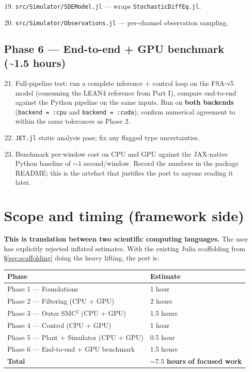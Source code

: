 \documentclass[11pt,a4paper]{article}
\begin{document}
\begin{enumerate}\setcounter{enumi}{18}
\item \texttt{src/Simulator/SDEModel.jl} --- wraps
  \texttt{StochasticDiffEq.jl}.
\item \texttt{src/Simulator/Observations.jl} --- per-channel
  observation sampling.
\end{enumerate}

\subsection{Phase 6 --- End-to-end + GPU benchmark
(\textasciitilde 1.5 hours)}

\begin{enumerate}\setcounter{enumi}{20}
\item Full-pipeline test: run a complete inference + control loop
  on the FSA-v5 model (consuming the LEAN4 reference from Part I),
  compare end-to-end against the Python pipeline on the same
  inputs. Run on \textbf{both backends}
  (\texttt{backend = :cpu} and \texttt{backend = :cuda}); confirm
  numerical agreement to within the same tolerances as Phase 2.
\item \texttt{JET.jl} static analysis pass; fix any flagged type
  uncertainties.
\item Benchmark per-window cost on CPU and GPU against the
  JAX-native Python baseline of $\sim 1$ second/window. Record
  the numbers in the package README; this is the artefact that
  justifies the port to anyone reading it later.
\end{enumerate}

\section{Scope and timing (framework side)}
\label{sec:scope-julia}

\textbf{This is translation between two scientific computing
languages.} The user has explicitly rejected inflated estimates.
With the existing Julia scaffolding from §\ref{sec:scaffolding}
doing the heavy lifting, the port is:

\begin{center}\small
\begin{tabular}{ll}
\toprule
Phase & Estimate \\
\midrule
Phase 1 --- Foundations                        & 1 hour \\
Phase 2 --- Filtering (CPU + GPU)              & 2 hours \\
Phase 3 --- Outer SMC$^2$ (CPU + GPU)          & 1.5 hours \\
Phase 4 --- Control (CPU + GPU)                & 1 hour \\
Phase 5 --- Plant + Simulator (CPU + GPU)      & 0.5 hour \\
Phase 6 --- End-to-end + GPU benchmark         & 1.5 hours \\
\midrule
\textbf{Total}                                 & \textbf{$\sim 7.5$ hours of focused work} \\
\bottomrule
\end{tabular}
\end{center}
\end{document}
